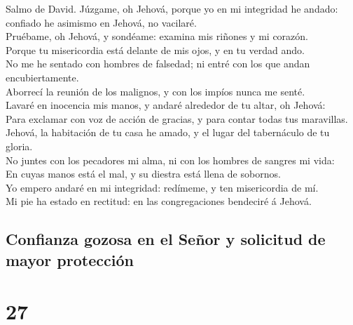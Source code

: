  Salmo de David. Júzgame, oh Jehová, porque yo en mi
integridad he andado: confiado he asimismo en Jehová, no vacilaré.\\
 Pruébame, oh Jehová, y sondéame: examina mis riñones y mi
corazón.\\
 Porque tu misericordia está delante de mis ojos, y en tu
verdad ando.\\
 No me he sentado con hombres de falsedad; ni entré con
los que andan encubiertamente.\\
 Aborrecí la reunión de los malignos, y con los impíos
nunca me senté.\\
 Lavaré en inocencia mis manos, y andaré alrededor de tu
altar, oh Jehová:\\
 Para exclamar con voz de acción de gracias, y para contar
todas tus maravillas.\\
 Jehová, la habitación de tu casa he amado, y el lugar del
tabernáculo de tu gloria.\\
 No juntes con los pecadores mi alma, ni con los hombres
de sangres mi vida:\\
 En cuyas manos está el mal, y su diestra está llena de
sobornos.\\
 Yo empero andaré en mi integridad: redímeme, y ten
misericordia de mí.\\
 Mi pie ha estado en rectitud: en las congregaciones
bendeciré á Jehová.

\hypertarget{confianza-gozosa-en-el-seuxf1or-y-solicitud-de-mayor-protecciuxf3n}{%
\subsection{Confianza gozosa en el Señor y solicitud de mayor
protección}\label{confianza-gozosa-en-el-seuxf1or-y-solicitud-de-mayor-protecciuxf3n}}

\hypertarget{section-19-27}{%
\section{27}\label{section-19-27}}

